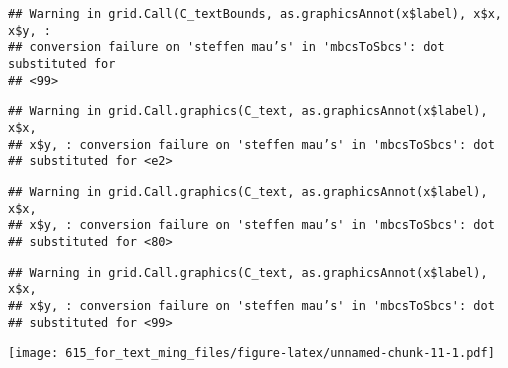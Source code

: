 \documentclass[]{article}
\begin{document}
\begin{verbatim}
## Warning in grid.Call(C_textBounds, as.graphicsAnnot(x$label), x$x, x$y, :
## conversion failure on 'steffen mau’s' in 'mbcsToSbcs': dot substituted for
## <99>
\end{verbatim}

\begin{verbatim}
## Warning in grid.Call.graphics(C_text, as.graphicsAnnot(x$label), x$x,
## x$y, : conversion failure on 'steffen mau’s' in 'mbcsToSbcs': dot
## substituted for <e2>
\end{verbatim}

\begin{verbatim}
## Warning in grid.Call.graphics(C_text, as.graphicsAnnot(x$label), x$x,
## x$y, : conversion failure on 'steffen mau’s' in 'mbcsToSbcs': dot
## substituted for <80>
\end{verbatim}

\begin{verbatim}
## Warning in grid.Call.graphics(C_text, as.graphicsAnnot(x$label), x$x,
## x$y, : conversion failure on 'steffen mau’s' in 'mbcsToSbcs': dot
## substituted for <99>
\end{verbatim}

\texttt{[image: 615\_for\_text\_ming\_files/figure-latex/unnamed-chunk-11-1.pdf]}
\end{document}
